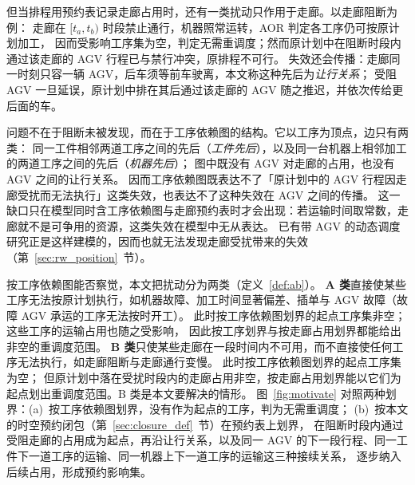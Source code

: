 \documentclass[manuscript,screen,review]{acmart}
\begin{document}
但当排程用预约表记录走廊占用时，还有一类扰动只作用于走廊。以走廊阻断为例：
走廊在 \([t_a,t_b)\) 时段禁止通行，机器照常运转，AOR 判定各工序仍可按原计划加工，
因而受影响工序集为空，判定无需重调度；然而原计划中在阻断时段内通过该走廊的 AGV 行程已与禁行冲突，原排程不可行。
失效还会传播：走廊同一时刻只容一辆 AGV，后车须等前车驶离，本文称这种先后为\emph{让行关系}；
受阻 AGV 一旦延误，原计划中排在其后通过该走廊的 AGV 随之推迟，并依次传给更后面的车。

问题不在于阻断未被发现，而在于工序依赖图的结构。它以工序为顶点，边只有两类：
同一工件相邻两道工序之间的先后（\emph{工件先后}），以及同一台机器上相邻加工的两道工序之间的先后（\emph{机器先后}）；
图中既没有 AGV 对走廊的占用，也没有 AGV 之间的让行关系。
因而工序依赖图既表达不了「原计划中的 AGV 行程因走廊受扰而无法执行」这类失效，也表达不了这种失效在 AGV 之间的传播。
这一缺口只在模型同时含工序依赖图与走廊预约表时才会出现：若运输时间取常数，走廊就不是可争用的资源，这类失效在模型中无从表达。
已有带 AGV 的动态调度研究正是这样建模的，因而也就无法发现走廊受扰带来的失效（第~\ref{sec:rw_position}~节）。

按工序依赖图能否察觉，本文把扰动分为两类（定义~\ref{def:ab}）。
\textbf{A 类}直接使某些工序无法按原计划执行，如机器故障、加工时间显著偏差、插单与 AGV 故障（故障 AGV 承运的工序无法按时开工）。
此时按工序依赖图划界的起点工序集非空；这些工序的运输占用也随之受影响，
因此按工序划界与按走廊占用划界都能给出非空的重调度范围。
\textbf{B 类}只使某些走廊在一段时间内不可用，而不直接使任何工序无法执行，如走廊阻断与走廊通行变慢。
此时按工序依赖图划界的起点工序集为空；
但原计划中落在受扰时段内的走廊占用非空，按走廊占用划界能以它们为起点划出重调度范围。B 类是本文要解决的情形。
图~\ref{fig:motivate} 对照两种划界：(a)~按工序依赖图划界，没有作为起点的工序，判为无需重调度；
(b)~按本文的时空预约闭包（第~\ref{sec:closure_def}~节）在预约表上划界，
在阻断时段内通过受阻走廊的占用成为起点，再沿让行关系，以及同一 AGV 的下一段行程、同一工件下一道工序的运输、同一机器上下一道工序的运输这三种接续关系，
逐步纳入后续占用，形成预约影响集。
\end{document}
